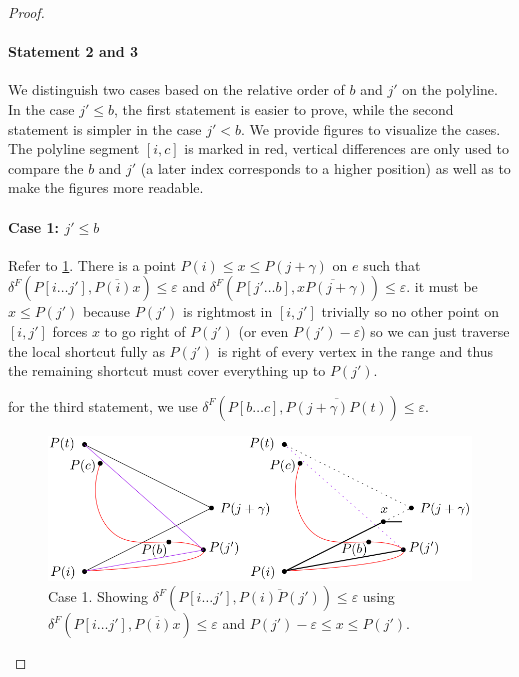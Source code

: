 \begin{proof}
	\paragraph{Statement 2 and 3}
	We distinguish two cases based on the relative order of \(b\) and \(j'\) on the polyline. In the case \(j' \leq b\), the first statement is easier to prove, while the second statement is simpler in the case \(j' < b\). We provide figures to visualize the cases. The polyline segment \([i, c]\) is marked in red, vertical differences are only used to compare the \(b\) and \(j'\) (a later index corresponds to a higher position) as well as to make the figures more readable.
	
	\paragraph{Case 1: \(j' \leq b\)}
	Refer to \cref{fig:case1}. There is a point \(P(i) \leq x \leq P(j + \gamma)\) on \(e\) such that \(\delta^F(P[i \dots j'], \overline{P(i)x}) \leq \varepsilon\) and \(\delta^F(P[j' \dots b], \overline{xP(j+\gamma)}) \leq \varepsilon\). it must be \(x \leq P(j')\) because \(P(j')\) is rightmost in \([i, j']\) trivially so no other point on \([i, j']\) forces \(x\) to go right of \(P(j')\) (or even \(P(j') - \varepsilon\)) so we can just traverse the local shortcut fully as \(P(j')\) is right of every vertex in the range and thus the remaining shortcut must cover everything up to \(P(j')\). 

	for the third statement, we use \(\delta^F(P[b\dots c], \overline{P(j+\gamma)P(t)}) \leq \varepsilon\). 

	\begin{figure}[b]
		\centering
		\includegraphics[scale=0.3]{./figures/case1.png}
		\caption{Case 1. Showing \(\delta^F(P[i \dots j'], \overline{P(i)P(j')}) \leq \varepsilon\) using \(\delta^F(P[i \dots j'], \overline{P(i)x}) \leq \varepsilon\) and \(P(j') - \varepsilon \leq x \leq P(j')\).}
		\label{fig:case1}
	\end{figure}


\end{proof}
